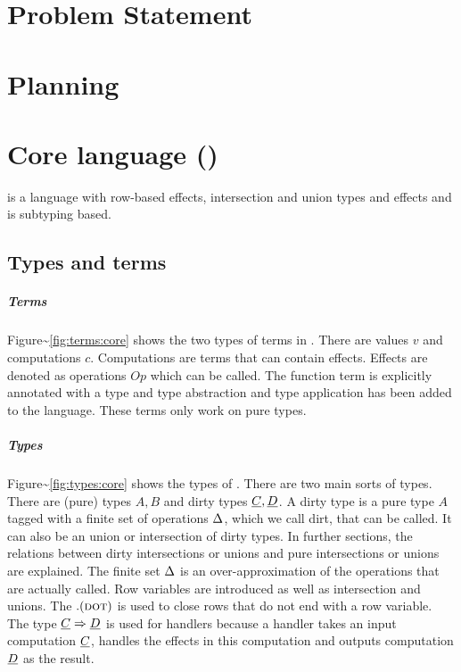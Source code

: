 \documentclass[master=cws,masteroption=ai, english]{kulemt}
\begin{document}
\chapter{Problem Statement}\label{problem-statement}

\chapter{Planning}\label{planning}

\chapter{\texorpdfstring{Core language
(\core)}{Core language ()}}\label{core-language}

\core is a language with row-based effects, intersection and union types
and effects and is subtyping based.

\section{Types and terms}\label{types-and-terms-1}

\paragraph{Terms}

Figure\textasciitilde{}\ref{fig:terms:core} shows the two types of terms
in \core. There are values \(v\) and computations \(c\). Computations
are terms that can contain effects. Effects are denoted as operations
\(Op\) which can be called. The function term is explicitly annotated
with a type and type abstraction and type application has been added to
the language. These terms only work on pure types.

\paragraph{Types}

Figure\textasciitilde{}\ref{fig:types:core} shows the types of \core.
There are two main sorts of types. There are (pure) types \(A, B\) and
dirty types \(\underline{C}, \underline{D}\). A dirty type is a pure type \(A\) tagged with a
finite set of operations \(\Delta\), which we call dirt, that can be
called. It can also be an union or intersection of dirty types. In
further sections, the relations between dirty intersections or unions
and pure intersections or unions are explained. The finite set \(\Delta\)
is an over-approximation of the operations that are actually called. Row
variables are introduced as well as intersection and unions. The
\(. (\textsc{dot})\) is used to close rows that do not end with a row variable.
The type \(\underline{C} \Rightarrow \underline{D}\) is used for handlers because a handler takes an
input computation \(\underline{C}\), handles the effects in this computation and
outputs computation \(\underline{D}\) as the result.
\end{document}

